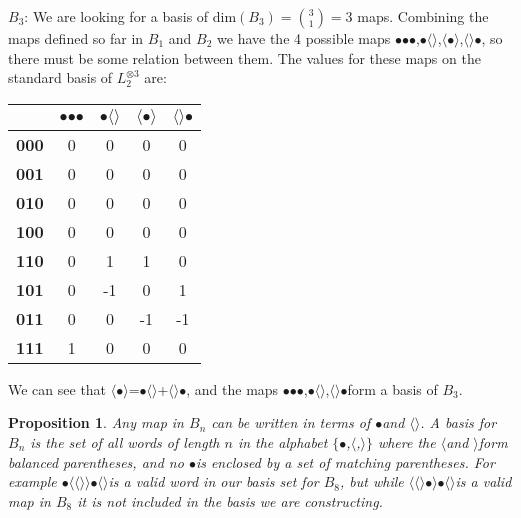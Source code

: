 \documentclass[11pt]{article} %
\newcommand{\lcap}{\boldmath$\langle$\unboldmath}
\newcommand{\rcap}{\boldmath$\rangle$\unboldmath}
\newcommand{\dotmap}{$\bullet$}
\begin{document}
\noindent\boldmath$B_3$\unboldmath: We are looking for a basis of dim$(B_3) = {3\choose1 }= 3$ maps. Combining the maps defined so far in $B_1$ and $B_2$ we have the 4 possible maps \dotmap\dotmap\dotmap,\dotmap\lcap\rcap,\lcap\dotmap\rcap,\lcap\rcap\dotmap, so there must be some relation between them. The values for these maps on the standard basis of $L_2^{\otimes 3}$ are:
\begin{center}
\begin{tabular}{| c | c | c | c | c |}
  \hline
   & \dotmap\dotmap\dotmap & \dotmap\lcap\rcap & \lcap\dotmap\rcap & \lcap\rcap\dotmap \\
  \hline			
  \textbf{000} & 0 & 0 & 0 & 0 \\
  \hline
  \textbf{001} & 0 & 0 & 0 & 0 \\
  \hline
  \textbf{010} & 0 & 0 & 0 & 0\\
  \hline
  \textbf{100} & 0 & 0 & 0 & 0\\
  \hline
  \textbf{110} & 0 & 1 & 1 & 0\\
  \hline
  \textbf{101} & 0 & -1 & 0 & 1\\
  \hline
  \textbf{011} & 0 & 0 & -1 & -1\\
  \hline
  \textbf{111} & 1 & 0 & 0 & 0\\
  \hline  
\end{tabular}
\end{center}

We can see that \lcap\dotmap\rcap=\dotmap\lcap\rcap+\lcap\rcap\dotmap, and the maps \dotmap\dotmap\dotmap,\dotmap\lcap\rcap,\lcap\rcap\dotmap\hspace{1.25mm}form a basis of $B_3$.

\newtheorem*{proposition}{Proposition}
\begin{proposition}
Any map in $B_n$ can be written in terms of \dotmap\hspace{1mm}and \lcap\rcap. A basis for $B_n$ is the set of all words of length $n$ in the alphabet $\{$\dotmap,\lcap,\rcap$\}$ where the \lcap\hspace{1mm}and \rcap\hspace{1mm}form balanced parentheses, and no \dotmap\hspace{1.25mm}is enclosed by a set of matching parentheses.  For example \dotmap\lcap\lcap\rcap\rcap\dotmap\lcap\rcap\hspace{1mm}is a valid word in our basis set for $B_8$, but while \lcap\lcap\rcap\dotmap\rcap\dotmap\lcap\rcap\hspace{1mm}is a valid map in $B_8$ it is not included in the basis we are constructing.
\end{proposition}
\end{document}
